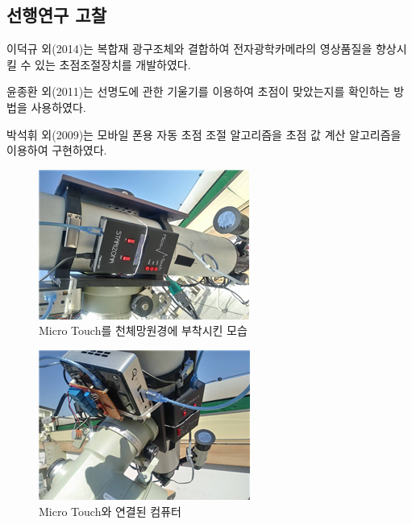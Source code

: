 \documentclass{abstract_hutech}
\begin{document}
\subsection{선행연구 고찰}

이덕규 외(2014)는 복합재 광구조체와 결합하여 전자광학카메라의 영상품질을 향상시킬 수 있는 초점조절장치를 개발하였다.\cite{leedukgu2014}

윤종환 외(2011)는 선명도에 관한 기울기를 이용하여 초점이 맞았는지를 확인하는 방법을 사용하였다.\cite{yunjonghwan2011lcd}

박석휘 외(2009)는 모바일 폰용 자동 초점 조절 알고리즘을 초점 값 계산 알고리즘을 이용하여 구현하였다.\cite{parksukhui2009Median}

\begin{figure}[h]
	\centering
	\includegraphics[width=1\linewidth]{telescope1}
	\caption{Micro Touch를 천체망원경에 부착시킨 모습}
	\label{fig:telescope1}
\end{figure}

\begin{figure}[h]
	\centering
	\includegraphics[width=1\linewidth]{telescope2}
	\caption{Micro Touch와 연결된 컴퓨터}
	\label{fig:telescope2}
\end{figure}
\end{document}
